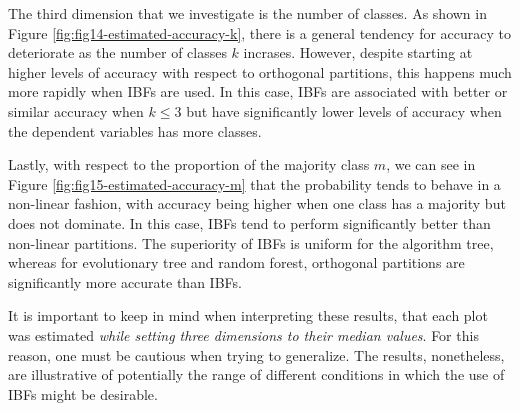 \documentclass[]{elsarticle} %
\begin{document}
The third dimension that we investigate is the number of classes. As
shown in Figure \ref{fig:fig14-estimated-accuracy-k}, there is a general
tendency for accuracy to deteriorate as the number of classes \(k\)
incrases. However, despite starting at higher levels of accuracy with
respect to orthogonal partitions, this happens much more rapidly when
IBFs are used. In this case, IBFs are associated with better or similar
accuracy when \(k\leq3\) but have significantly lower levels of accuracy
when the dependent variables has more classes.

Lastly, with respect to the proportion of the majority class \(m\), we
can see in Figure \ref{fig:fig15-estimated-accuracy-m} that the
probability tends to behave in a non-linear fashion, with accuracy being
higher when one class has a majority but does not dominate. In this
case, IBFs tend to perform significantly better than non-linear
partitions. The superiority of IBFs is uniform for the algorithm tree,
whereas for evolutionary tree and random forest, orthogonal partitions
are significantly more accurate than IBFs.

It is important to keep in mind when interpreting these results, that
each plot was estimated \emph{while setting three dimensions to their
median values}. For this reason, one must be cautious when trying to
generalize. The results, nonetheless, are illustrative of potentially
the range of different conditions in which the use of IBFs might be
desirable.
\end{document}
